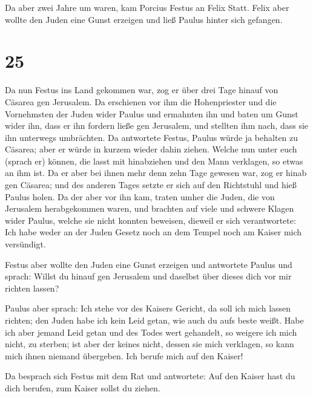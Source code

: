  Da aber zwei Jahre um waren, kam Porcius Festus an Felix
Statt. Felix aber wollte den Juden eine Gunst erzeigen und ließ Paulus
hinter sich gefangen.

\hypertarget{section-24}{%
\section{25}\label{section-24}}

 Da nun Festus ins Land gekommen war, zog er über drei
Tage hinauf von Cäsarea gen Jerusalem.  Da erschienen vor
ihm die Hohenpriester und die Vornehmsten der Juden wider Paulus und
ermahnten ihn  und baten um Gunst wider ihn, dass er ihn
fordern ließe gen Jerusalem, und stellten ihm nach, dass sie ihn
unterwegs umbrächten.  Da antwortete Festus, Paulus würde
ja behalten zu Cäsarea; aber er würde in kurzem wieder dahin ziehen.
 Welche nun unter euch (sprach er) können, die lasst mit
hinabziehen und den Mann verklagen, so etwas an ihm ist. 
Da er aber bei ihnen mehr denn zehn Tage gewesen war, zog er hinab gen
Cäsarea; und des anderen Tages setzte er sich auf den Richtstuhl und
hieß Paulus holen.  Da der aber vor ihn kam, traten umher
die Juden, die von Jerusalem herabgekommen waren, und brachten auf viele
und schwere Klagen wider Paulus, welche sie nicht konnten beweisen,
 dieweil er sich verantwortete: Ich habe weder an der
Juden Gesetz noch an dem Tempel noch am Kaiser mich versündigt.

 Festus aber wollte den Juden eine Gunst erzeigen und
antwortete Paulus und sprach: Willst du hinauf gen Jerusalem und
daselbst über dieses dich vor mir richten lassen?

 Paulus aber sprach: Ich stehe vor des Kaisers Gericht,
da soll ich mich lassen richten; den Juden habe ich kein Leid getan, wie
auch du aufs beste weißt.  Habe ich aber jemand Leid
getan und des Todes wert gehandelt, so weigere ich mich nicht, zu
sterben; ist aber der keines nicht, dessen sie mich verklagen, so kann
mich ihnen niemand übergeben. Ich berufe mich auf den Kaiser!

 Da besprach sich Festus mit dem Rat und antwortete: Auf
den Kaiser hast du dich berufen, zum Kaiser sollst du ziehen.

